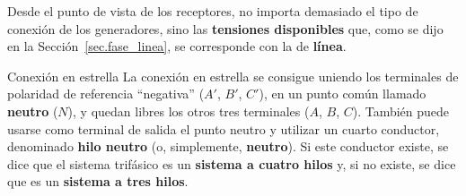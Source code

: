\documentclass[11pt]{book} %
\makeatletter
\numberwithin{dummy}{section}
\theoremstyle{ocrenumbox}
\theoremstyle{blacknumex}
\theoremstyle{blacknumbox}
\theoremstyle{ocrenum}
\newenvironment{remark}{\par\vspace{10pt}\small %
\begin{list}{}{
\leftmargin=35pt %
\rightmargin=25pt}\item\ignorespaces %
\makebox[-2.5pt]{\begin{tikzpicture}[overlay]
\node[draw=ocre!60,line width=1pt,circle,fill=ocre!25,font=\sffamily\bfseries,inner sep=2pt,outer sep=0pt] at (-15pt,0pt){\textcolor{ocre}{N}};\end{tikzpicture}} %
\advance\baselineskip -1pt}{\end{list}\vskip5pt} %
\renewcommand{\subsection}{\@startsection {subsection}{2}{\z@}
{-3ex \@plus -0.1ex \@minus -.4ex}
{0.5ex \@plus.2ex }
{\normalfont\sffamily\bfseries}}
\newlength\esp
\makeatother
\begin{document}
	\begin{remark}
	    Desde el punto de vista de los receptores, no importa demasiado el tipo de conexión de los generadores, sino las \textbf{tensiones disponibles} que, como se dijo en la Sección~\ref{sec.fase_linea}, se corresponde con la de \textbf{línea}.
	\end{remark}
	
	
	\subsection{Conexión en estrella}
	La conexión en estrella se consigue uniendo los terminales de polaridad de referencia ``negativa'' ($A'$, $B'$, $C'$), en un punto común llamado \textbf{neutro} ($N$), y quedan libres los otros tres terminales ($A$, $B$, $C$). También puede usarse como terminal de salida el punto neutro y utilizar un cuarto conductor, denominado \textbf{hilo neutro} (o, simplemente, \textbf{neutro}). Si este conductor existe, se dice que el sistema trifásico es un \textbf{sistema a cuatro hilos} y, si no existe, se dice que es un \textbf{sistema a tres hilos}. 
	
\end{document}
